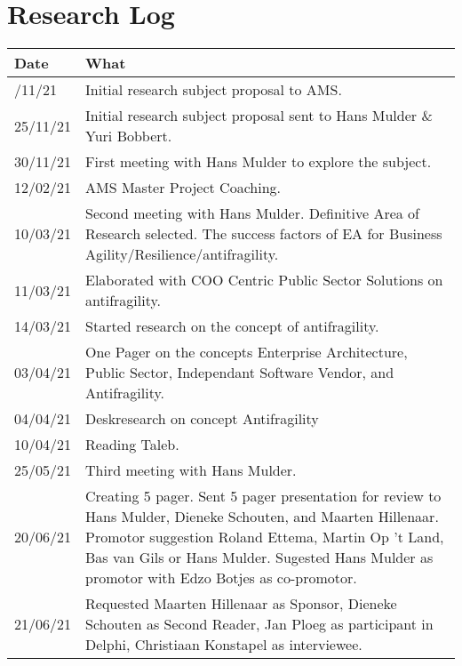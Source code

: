 \chapter{Research Log}
\label{app:researchlog}


\begin{longtable}{p{}p{}}
			\toprule
			\textbf{Date} & \textbf{What} \\ \midrule%
			\endhead%
			\hline
			\endfoot%
			24/11/21 & Initial research subject proposal to AMS.\\%
			25/11/21 & Initial research subject proposal sent to Hans Mulder \& Yuri Bobbert.\\%
			30/11/21 & First meeting with Hans Mulder to explore the subject.\\%
			12/02/21 & AMS Master Project Coaching.\\%
			10/03/21 & Second meeting with Hans Mulder. Definitive Area of Research selected. The success factors of EA for Business Agility/Resilience/antifragility.\\%
			11/03/21 & Elaborated with COO Centric Public Sector Solutions on antifragility.\\%
			14/03/21 & Started research on the concept of antifragility.\\%
			03/04/21 & One Pager on the concepts Enterprise Architecture, Public Sector, Independant Software Vendor, and Antifragility.\\%
			04/04/21 & Deskresearch on concept Antifragility\\%
			10/04/21 & Reading Taleb.\\%
			25/05/21 & Third meeting with Hans Mulder.\\%
			20/06/21 & Creating 5 pager. Sent 5 pager presentation for review to Hans Mulder, Dieneke Schouten, and Maarten Hillenaar. Promotor suggestion Roland Ettema, Martin Op 't Land, Bas van Gils or Hans Mulder. Sugested Hans Mulder as promotor with Edzo Botjes as co-promotor.\\%
			21/06/21 & Requested Maarten Hillenaar as Sponsor, Dieneke Schouten as Second Reader, Jan Ploeg as participant in Delphi, Christiaan Konstapel as interviewee.\\%

\end{longtable}
